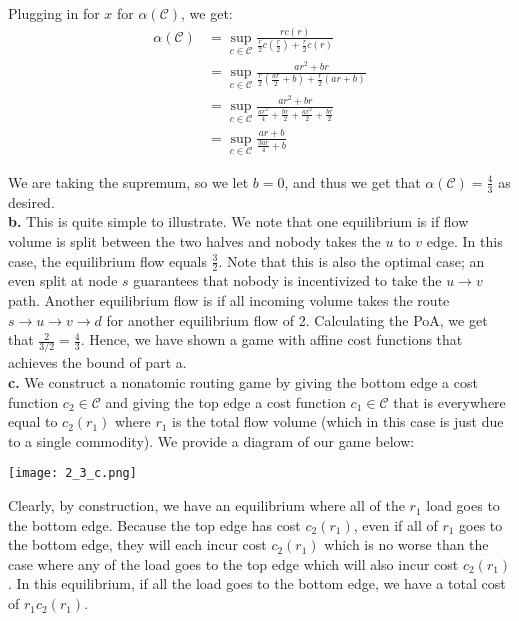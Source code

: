 \documentclass[12 pt]{article}
\begin{document}
	\noindent Plugging in for $x$ for $\alpha (\mathcal{C})$, we get:
	\[
	\begin{split}
	\alpha(\mathcal{C}) & = \sup_{c \in \mathcal{C}} \frac{r c(r)}{\frac{r}{2} c(\frac{r}{2}) + \frac{r}{2} c(r)} \\
	& = \sup_{c \in \mathcal{C}} \frac{ar^2 + br}{\frac{r}{2} (\frac{ar}{2} + b) + \frac{r}{2} (ar + b)}\\
	& = \sup_{c \in \mathcal{C}} \frac{ar^2 + br}{\frac{ar^2}{4} + \frac{br}{2} + \frac{ar^2}{2} + \frac{br}{2}}\\
	& = \sup_{c \in \mathcal{C}} \frac{ar + b}{\frac{3ar}{4} + b}
	\end{split}
	\]
	
	\noindent We are taking the supremum, so we let $b = 0$, and thus we get that $\alpha(\mathcal{C}) = \frac{4}{3}$ as desired. \\
	
	\noindent \textbf{b.} This is quite simple to illustrate. We note that one equilibrium is if flow volume is split between the two halves and nobody takes the $u$ to $v$ edge. In this case, the equilibrium flow equals $\frac{3}{2}$. Note that this is also the optimal case; an even split at node $s$ guarantees that nobody is incentivized to take the $u \rightarrow v$ path. Another equilibrium flow is if all incoming volume takes the route $s \rightarrow u \rightarrow v \rightarrow d$ for another equilibrium flow of 2. Calculating the PoA, we get that $\frac{2}{3/2} = \frac{4}{3}$. Hence, we have shown a game with affine cost functions that achieves the bound of part a. \\
	
	\noindent \textbf{c.} We construct a nonatomic routing game by giving the bottom edge a cost function $c_2 \in \mathcal{C}$ and giving the top edge a cost function $c_1 \in \mathcal{C}$ that is everywhere equal to $c_2(r_1)$ where $r_1$ is the total flow volume (which in this case is just due to a single commodity). We provide a diagram of our game below: \\
	
	\begin{center}
		\texttt{[image: 2\_3\_c.png]}
	\end{center}
	
	\noindent Clearly, by construction, we have an equilibrium where all of the $r_1$ load goes to the bottom edge. Because the top edge has cost $c_2(r_1)$, even if all of $r_1$ goes to the bottom edge, they will each incur cost $c_2(r_1)$ which is no worse than the case where any of the load goes to the top edge which will also incur cost $c_2(r_1)$. In this equilibrium, if all the load goes to the bottom edge, we have a total cost of $r_1c_2(r_1)$. \\
	
\end{document}
